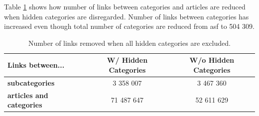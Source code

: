 Table \ref{tab:withouthiddencat} shows how number of links between categories and articles are reduced when hidden categories are disregarded. Number of links between categories has increased even though total number of categories are reduced from asf to 504 309.


\begin{table}[h]
\centering
\begin{tabular}{l|c|c}
\textbf{Links between...} & \textbf{W/ Hidden Categories} & \textbf{W/o Hidden Categories}  \\ \hline
 \textbf{subcategories} & 3 358 007  & 3 467 360\\
 \textbf{articles and categories} & 71 487 647  & 52 611 629 
\end{tabular}
\caption[Number of links without hidden categories]{Number of links removed when all hidden categories are excluded. }
\label{tab:withouthiddencat}
\end{table}

